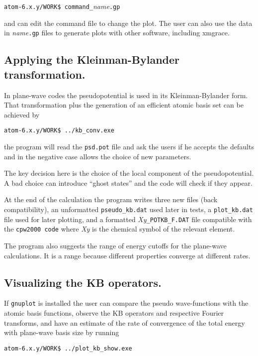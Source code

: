\documentclass[11pt]{article}
\begin{document}
\noindent\texttt{atom-6.x.y/WORK\$ command{\_}}{\it name}\texttt{.gp}

and can edit the command file to change the plot.  The user can also use the data in {\it name}\texttt{.gp} files
to generate plots with other software, including xmgrace.


\subsection{Applying the Kleinman-Bylander transformation.}
\label{sec:run-KB}

In plane-wave codes the pseudopotential is used in its Kleinman-Bylander form.  That transformation
plus the generation of an efficient atomic basis set can be achieved by

\noindent\texttt{atom-6.x.y/WORK\$ ../kb{\_}conv.exe}

the program will read the \texttt{psd.pot} file and ask the users if he accepts the defaults and
in the negative case allows the choice of new parameters.

The key decision here is the choice of the local component of the pseudopotential.  A bad choice
can introduce ``ghost states'' and the code will check if they appear.

At the end of the calculation the program writes three new files (back compatibility), an unformatted
\texttt{pseudo{\_}kb.dat} used later in tests,
a \texttt{plot{\_}kb.dat} file used for later plotting, and
a formatted {\it Xy}\texttt{{\_}POTKB{\_}F.DAT} file compatible with the \texttt{cpw2000 code} where  {\it Xy}
is the chemical symbol of the relevant element.

The program also suggests the range of energy cutoffs for the plane-wave calculations.  It is a range because
different properties converge at different rates.


\subsection{Visualizing the KB operators.}
\label{sec:run-show-KB}

If \texttt{gnuplot} is installed the user can compare the pseudo wave-functions with the atomic basis functions,
observe the KB operators and respective Fourier transforms, and have an estimate of the rate
of convergence of the total energy with plane-wave basis size by running

\noindent\texttt{atom-6.x.y/WORK\$ ../plot{\_}kb{\_}show.exe}
\end{document}
